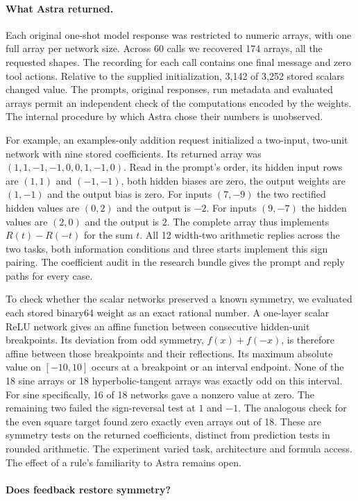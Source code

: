 \paragraph{What Astra returned.}
Each original one-shot model response was restricted to numeric arrays, with one full array per network size. Across 60 calls we recovered 174 arrays, all the requested shapes. The recording for each call contains one final message and zero tool actions. Relative to the supplied initialization, 3,142 of 3,252 stored scalars changed value. The prompts, original responses, run metadata and evaluated arrays permit an independent check of the computations encoded by the weights. The internal procedure by which Astra chose their numbers is unobserved.

For example, an examples-only addition request initialized a two-input, two-unit network with nine stored coefficients. Its returned array was $(1,1,-1,-1,0,0,1,-1,0)$. Read in the prompt's order, its hidden input rows are $(1,1)$ and $(-1,-1)$, both hidden biases are zero, the output weights are $(1,-1)$ and the output bias is zero. For inputs $(7,-9)$ the two rectified hidden values are $(0,2)$ and the output is $-2$. For inputs $(9,-7)$ the hidden values are $(2,0)$ and the output is $2$. The complete array thus implements $R(t)-R(-t)$ for the sum $t$. All 12 width-two arithmetic replies across the two tasks, both information conditions and three starts implement this sign pairing. The coefficient audit in the research bundle gives the prompt and reply paths for every case.

To check whether the scalar networks preserved a known symmetry, we evaluated each stored binary64 weight as an exact rational number. A one-layer scalar ReLU network gives an affine function between consecutive hidden-unit breakpoints. Its deviation from odd symmetry, $f(x)+f(-x)$, is therefore affine between those breakpoints and their reflections. Its maximum absolute value on $[-10,10]$ occurs at a breakpoint or an interval endpoint. None of the 18 sine arrays or 18 hyperbolic-tangent arrays was exactly odd on this interval. For sine specifically, 16 of 18 networks gave a nonzero value at zero. The remaining two failed the sign-reversal test at $1$ and $-1$. The analogous check for the even square target found zero exactly even arrays out of 18. These are symmetry tests on the returned coefficients, distinct from prediction tests in rounded arithmetic. The experiment varied task, architecture and formula access. The effect of a rule's familiarity to Astra remains open.

\paragraph{Does feedback restore symmetry?} 
